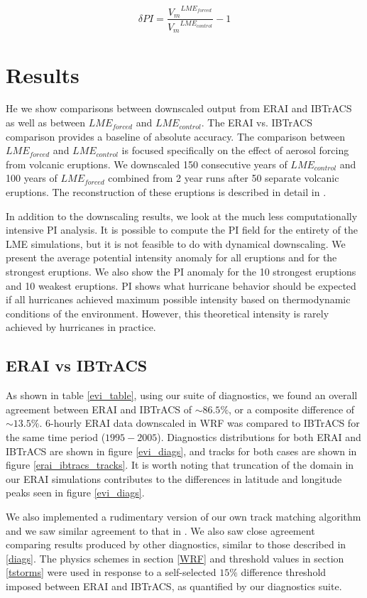 \documentclass[phd,tocprelim]{cornell}
\begin{document}
\begin{equation}
\delta PI = \frac{{V_{m}}^{LME_{forced}}}{{V_{m}}^{LME_{control}}}-1
\label{dpi}
\end{equation}


\section{Results}
\label{results}
He we show comparisons between downscaled output from ERAI and IBTrACS as well as between $LME_{forced}$ and $LME_{control}$. The ERAI vs. IBTrACS comparison provides a baseline of absolute accuracy. The comparison between $LME_{forced}$ and $LME_{control}$ is focused specifically on the effect of aerosol forcing from volcanic eruptions. We downscaled 150 consecutive years of $LME_{control}$ and 100 years of $LME_{forced}$ combined from 2 year runs after 50 separate volcanic eruptions. The reconstruction of these eruptions is described in detail in \cite{erups_recon}. 
\par
In addition to the downscaling results, we look at the much less computationally intensive PI analysis. It is possible to compute the PI field for the entirety of the LME simulations, but it is not feasible to do with dynamical downscaling. We present the average potential intensity anomaly for all eruptions and for the strongest eruptions. We also show the PI anomaly for the 10 strongest eruptions and 10 weakest eruptions. PI shows what hurricane behavior should be expected if all hurricanes achieved maximum possible intensity based on thermodynamic conditions of the environment. However, this theoretical intensity is rarely achieved by hurricanes in practice.

\subsection{ERAI vs IBTrACS}
As shown in table \ref{evi_table}, using our suite of diagnostics, we found an overall agreement between ERAI and IBTrACS of ${\sim}86.5\%$, or a composite difference of ${\sim}13.5\%$. $6$-hourly ERAI data downscaled in WRF was compared to IBTrACS for the same time period ($1995-2005$). Diagnostics distributions for both ERAI and IBTrACS are shown in figure \ref{evi_diags}, and tracks for both cases are shown in figure \ref{erai_ibtracs_tracks}. It is worth noting that truncation of the domain in our ERAI simulations contributes to the differences in latitude and longitude peaks seen in figure \ref{evi_diags}.  
\par
We also implemented a rudimentary version of our own track matching algorithm and we saw similar agreement to that in \cite{hodges2017well}. We also saw close agreement comparing results produced by other diagnostics, similar to those described in \ref{diags}. The physics schemes in section \ref{WRF} and threshold values in section \ref{tstorms} were used in response to a self-selected $15\%$ difference threshold imposed between ERAI and IBTrACS, as quantified by our diagnostics suite. 
\end{document}
